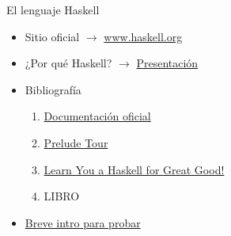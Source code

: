 \begin{frame}{El lenguaje Haskell}
\begin{itemize}
    \item Sitio oficial $\rightarrow$ \href{www.haskell.org}{www.haskell.org}
    \item ¿Por qué Haskell? $\rightarrow$ \href{https://es.slideshare.net/RevistaSG/programacin-funcional-con-haskell}{Presentación}
    \item Bibliografía
    \begin{enumerate}
        \item \href{https://www.haskell.org/documentation/}{Documentación oficial}
        \item \href{https://www.cse.chalmers.se/edu/year/2017/course/TDA452/Haskell-Prelude-Tour-A4.pdf}{Prelude Tour}
        \item \href{http://learnyouahaskell.com/}{Learn You a Haskell for Great Good!}
        \item LIBRO
    \end{enumerate}
    \item \href{https://tryhaskell.org/}{Breve intro para probar}
\end{itemize}
\end{frame}
